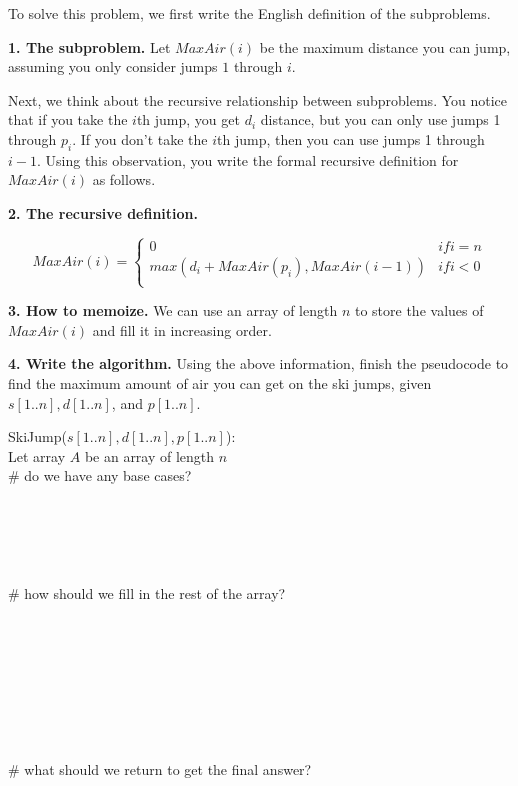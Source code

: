 \documentclass[11pt]{article}
\begin{document}
\begin{enumerate}
To solve this problem, we first write the English definition of the subproblems.

    \textbf{1. The subproblem.} Let $MaxAir(i)$ be the maximum distance you can jump,
    assuming you only consider jumps $1$ through $i$.

    Next, we think about the recursive relationship between subproblems.  You
    notice that if you take the $i$th jump, you get $d_i$ distance, but you can only use
    jumps 1 through $p_i$. If you don't take the $i$th jump, then you can use jumps
    1 through $i-1$. Using this observation, you write the formal recursive definition for
    $MaxAir(i)$ as follows.

    \textbf{2. The recursive definition.} 

    \begin{equation*}
        MaxAir(i) =
        \begin{cases}
            0 & if i = n \\
            max(d_i + MaxAir(p_i), MaxAir(i-1)) & if i < 0 \\

        \end{cases}
    \end{equation*}

    \textbf{3. How to memoize.} We can use an array of length $n$ to store the values of $MaxAir(i)$
    and fill it in increasing order.


    \textbf{4. Write the algorithm.} Using the above information, finish the pseudocode
    to find the maximum amount of air you can get on the ski jumps,
    given $s[1..n], d[1..n]$, and $p[1..n]$.
    \begin{algo}
    SkiJump($s[1..n], d[1..n], p[1..n]$):\+\\
    Let array $A$ be an array of length $n$\\
    \# do we have any base cases?\\
    \\
    \\
    \\
    \\
    \\
    \# how should we fill in the rest of the array?\\
    \\
    \\
    \\
    \\
    \\
    \\
    \\
    \\
    \# what should we return to get the final answer?\\
    \\
    \\
    \\
    \hspace{5in}
    \end{algo}



\end{enumerate}
\end{document}
